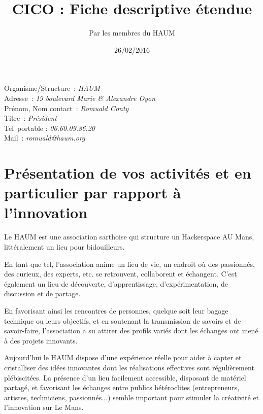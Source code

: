 \documentclass[a4paper,10pt]{scrartcl}
\title{CICO : Fiche descriptive étendue}
\author{Par les membres du HAUM}
\date{26/02/2016}
\begin{document}
\maketitle

\hfill
{}

\begin{minipage}{10cm}
Organisme/Structure : \emph{HAUM}\\
Adresse : \emph{19 boulevard Marie \& Alexandre Oyon}\\
Prénom, Nom contact : \emph{Romuald Conty}\\
Titre : \emph{Président}\\
Tel portable : \emph{06.60.09.86.20}\\
Mail : \emph{romuald@haum.org}\\
\end{minipage}


\section{Présentation de vos activités et en particulier par rapport à l’innovation}

Le HAUM est une association sarthoise qui structure un Hackerspace AU Mans, littéralement un lieu pour bidouilleurs.

En tant que tel, l'association anime un lieu de vie, un endroit où des passionnés, des curieux, des experts, etc. se retrouvent, collaborent et échangent. C'est également un lieu de découverte, d'apprentissage, d'expérimentation, de discussion et de partage.

En favorisant ainsi les rencontres de personnes, quelque soit leur bagage technique ou leurs objectifs, et en soutenant la transmission de savoirs et de savoir-faire, l'association a su attirer des profils variés dont les échanges ont mené à des projets innovants.

Aujourd'hui le HAUM dispose d'une expérience réelle pour aider à capter et cristalliser des idées innovantes dont les réalisations effectives sont régulièrement plébiscitées. La présence d'un lieu facilement accessible, disposant de matériel partagé, et favorisant les échanges entre publics hétéroclites (entrepreneurs, artistes, techniciens, passionnés...) semble important pour stimuler la créativité et l'innovation sur Le Mans. 
\end{document}

